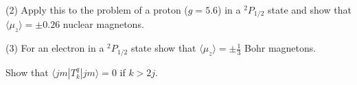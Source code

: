 \documentclass[../principles-of-quantum-mechanics.tex]{subfiles}
\begin{document}
\begin{questions}
		(2) Apply this to the problem of a proton ($g = 5.6$) in a $^2P_{1/2}$ state and show that $\langle\mu_z\rangle = \pm 0.26$ nuclear magnetons.
		
		(3) For an electron in a $^2P_{1/2}$ state show that $\langle \mu_z\rangle = \pm\tfrac{1}{3}$ Bohr magnetons.
		
		\question Show that $\langle jm|T_k^q|jm\rangle = 0$ if $k > 2j$.
	\end{questions}
\end{document}
